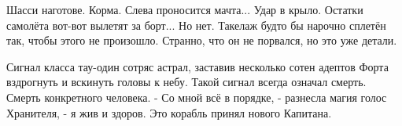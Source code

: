 Шасси наготове. Корма. Слева проносится мачта... Удар в крыло. Остатки самолёта вот-вот вылетят за борт... Но нет. Такелаж будто бы нарочно сплетён так, чтобы этого не произошло. Странно, что он не порвался, но это уже детали.


Сигнал класса тау-один сотряс астрал, заставив несколько сотен адептов Форта вздрогнуть и вскинуть головы к небу.
Такой сигнал всегда означал смерть. Смерть конкретного человека.
 - Со мной всё в порядке, - разнесла магия голос Хранителя, - я жив и здоров. Это корабль принял нового Капитана.

